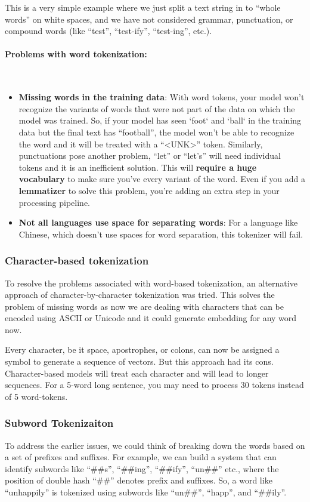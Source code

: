 This is a very simple example where we just split a text string in to ``whole words'' on white spaces, and we have not considered grammar, punctuation, or compound words (like ``test'', ``test-ify'', ``test-ing'', etc.).

\paragraph{Problems with word tokenization:} \mbox{}\\
\begin{itemize}
    \item \textbf{Missing words in the training data}: With word tokens, your model won't recognize the variants of words that were not part of the data on which the model was trained. So, if your model has seen `foot` and `ball` in the training data but the final text has ``football'', the model won't be able to recognize the word and it will be treated with a ``<UNK>'' token. Similarly, punctuations pose another problem, ``let'' or ``let's'' will need individual tokens and it is an inefficient solution. This will \textbf{require a huge vocabulary} to make sure you've every variant of the word. Even if you add a \textbf{lemmatizer} to solve this problem, you're adding an extra step in your processing pipeline.
    \item \textbf{Not all languages use space for separating words}: For a language like Chinese, which doesn't use spaces for word separation, this tokenizer will fail.
\end{itemize}

\subsubsection{Character-based tokenization}
To resolve the problems associated with word-based tokenization, an alternative approach of character-by-character tokenization was tried. This solves the problem of missing words as now we are dealing with characters that can be encoded using ASCII or Unicode and it could generate embedding for any word now. 

Every character, be it space, apostrophes, or colons, can now be assigned a symbol to generate a sequence of vectors. But this approach had its cons. Character-based models will treat each character and will lead to longer sequences. For a 5-word long sentence, you may need to process 30 tokens instead of 5 word-tokens.

\subsubsection{Subword Tokenizaiton}
To address the earlier issues, we could think of breaking down the words based on a set of prefixes and suffixes. For example, we can build a system that can identify subwords like ``\#\#s'', ``\#\#ing'', ``\#\#ify'', ``un\#\#'' etc., where the position of double hash ``\#\#'' denotes prefix and suffixes. So, a word like ``unhappily'' is tokenized using subwords like ``un\#\#'', ``happ'', and ``\#\#ily''.

